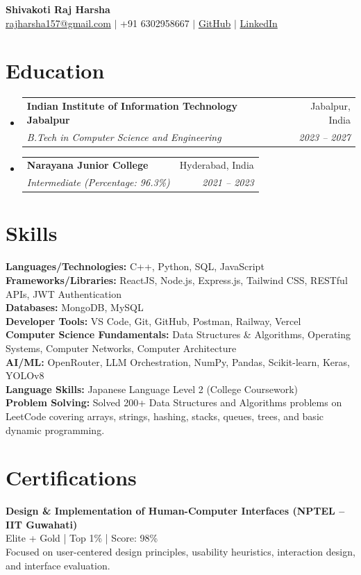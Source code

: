 \documentclass[letterpaper,10pt]{article}
\makeatletter
\newcommand{\resumeSubheading}[4]{
  \vspace{-3pt}\item
    \begin{tabular*}{0.97\textwidth}[t]{l@{\extracolsep{\fill}}r}
      \textbf{#1} & #2 \\
      \textit{\small#3} & \textit{\small #4} \\
    \end{tabular*}\vspace{-5pt}
}
\newcommand{\resumeSubHeadingListStart}{\begin{itemize}[leftmargin=0.15in, label={}]}
\newcommand{\resumeSubHeadingListEnd}{\end{itemize}}
\makeatother
\begin{document}
\begin{center}
    {\Huge \textbf{Shivakoti Raj Harsha}} \\[1pt]
    \href{mailto:rajharsha157@gmail.com}{rajharsha157@gmail.com} $|$ +91 6302958667 $|$ 
    \href{https://github.com/SRH550}{GitHub} $|$ 
    \href{https://www.linkedin.com/in/raj-harsha-b67688277/}{LinkedIn}
\end{center}

\section{Education}
\resumeSubHeadingListStart
  \resumeSubheading
    {Indian Institute of Information Technology Jabalpur}{Jabalpur, India}
    {B.Tech in Computer Science and Engineering}{2023 -- 2027}
  \resumeSubheading
    {Narayana Junior College}{Hyderabad, India}
    {Intermediate (Percentage: 96.3\%)}{2021 -- 2023}
\resumeSubHeadingListEnd

\section*{ Skills}

\textbf{Languages/Technologies:} C++, Python, SQL, JavaScript \\
\textbf{Frameworks/Libraries:} ReactJS, Node.js, Express.js, Tailwind CSS, RESTful APIs, JWT Authentication \\
\textbf{Databases:} MongoDB, MySQL \\
\textbf{Developer Tools:} VS Code, Git, GitHub, Postman, Railway, Vercel \\
\textbf{Computer Science Fundamentals:} Data Structures \& Algorithms, Operating Systems, Computer Networks, Computer Architecture \\
\textbf{AI/ML:} OpenRouter, LLM Orchestration, NumPy, Pandas, Scikit-learn, Keras, YOLOv8 \\
\textbf{Language Skills:} Japanese Language Level 2 (College Coursework) \\
\textbf{Problem Solving:} Solved 200+ Data Structures and Algorithms problems on LeetCode covering arrays, strings, hashing, stacks, queues, trees, and basic dynamic programming.


\section*{Certifications}
\textbf{Design \& Implementation of Human-Computer Interfaces (NPTEL – IIT Guwahati)} \\
Elite + Gold | Top 1\% | Score: 98\% \\
Focused on user-centered design principles, usability heuristics, interaction design, and interface evaluation.
\end{document}
